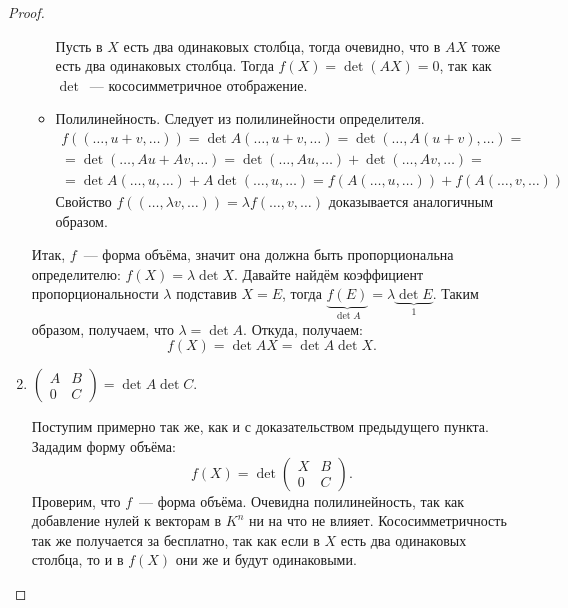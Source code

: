 \begin{proof}
\begin{enumerate}
\begin{itemize}
                     Пусть в $X$ есть два одинаковых столбца, тогда очевидно, что в $AX$ тоже есть два
                     одинаковых столбца. Тогда $f(X) = \det(AX) = 0$, так как $\det$~--- кососимметричное отображение.
                 \item Полилинейность. Следует из полилинейности определителя.
                     \[
                     \begin{gathered}
                     f\left((\dots, u+v,\dots)\right) =
                     \det A(\dots, u + v, \dots) =
                     \det \left(\dots, A(u + v), \dots\right)
                     =\\=
                     \det\left(\dots, Au + Av, \dots\right) =
                     \det\left(\dots, Au, \dots\right) + \det\left(\dots, Av, \dots\right) 
                     =\\=
                     \det A(\dots, u, \dots) + A\det(\dots, u, \dots) =
                     f\left(A(\dots, u,\dots)\right) + f\left(A(\dots, v,\dots)\right)
                     \end{gathered}
                     \]
                     Свойство $f\left((\dots, \lambda v, \dots)\right) = \lambda f\left(\dots, v, \dots\right)$
                     доказывается аналогичным образом.
             \end{itemize}
             Итак, $f$~--- форма объёма, значит она должна быть пропорциональна определителю: $f(X) = \lambda \det X$.
             Давайте найдём коэффициент пропорциональности $\lambda$ подставив $X = E$,
             тогда $\underbrace{f(E)}_{\det A} = \lambda \underbrace{\det E}_{1}$.
             Таким образом, получаем, что $\lambda = \det A$. Откуда, получаем:
             \[
                 f(X) = \det AX = \det A \det X
             .\]

         \item
            $\left(\begin{array}{c|c}
                    A & B\\
                    \hline
                    0 & C
            \end{array}\right) = \det A \det C
            .$

             Поступим примерно так же, как и с доказательством предыдущего пункта. Зададим форму объёма:
             \[
                 f(X) 
                 =
                 \det \left(\begin{array}{c|c}
                     X & B\\
                     \hline
                     0 & C
                 \end{array}\right)
             .\]
             Проверим, что $f$~--- форма объёма. Очевидна полилинейность,
             так как добавление нулей к векторам в $K^n$ ни на что не влияет.
             Кососимметричность так же получается за бесплатно, так как если в 
             $X$ есть два одинаковых столбца, то и в $f(X)$ они же и будут одинаковыми.


\end{enumerate}
\end{proof}
